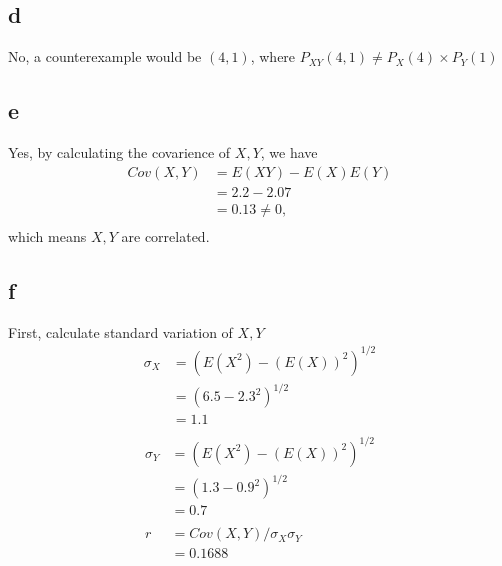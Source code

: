 \documentclass[12pt,letterpaper]{article}
\begin{document}
    \subsection*{d}
        No, a counterexample would be $(4, 1)$, where $P_{XY}(4, 1) \not= P_{X}(4) \times P_{Y}(1)$
    \subsection*{e}
        Yes, by calculating the covarience of $X, Y$, we have
        \begin{equation*}
            \begin{aligned}
                Cov(X, Y) &= E(XY) - E(X)E(Y) \\
                &= 2.2 - 2.07 \\
                &= 0.13 \not= 0, \\
            \end{aligned}
        \end{equation*}
        which means $X, Y$ are correlated.
    \subsection*{f}
        First, calculate standard variation of $X, Y$
        \begin{equation*}
            \begin{aligned}
                \sigma_{X} &= (E(X^{2}) - (E(X))^{2})^{1/2} \\
                &= (6.5 - 2.3^{2})^{1/2} \\
                &= 1.1 \\
            \end{aligned}
        \end{equation*}
        \begin{equation*}
            \begin{aligned}
                \sigma_{Y} &= (E(X^{2}) - (E(X))^{2})^{1/2} \\
                &= (1.3 - 0.9^{2})^{1/2} \\
                &= 0.7 \\
                \\
                r &= Cov(X, Y) / \sigma_{X}\sigma_{Y} \\
                &= 0.1688 \\
            \end{aligned}
        \end{equation*}
\end{document}
